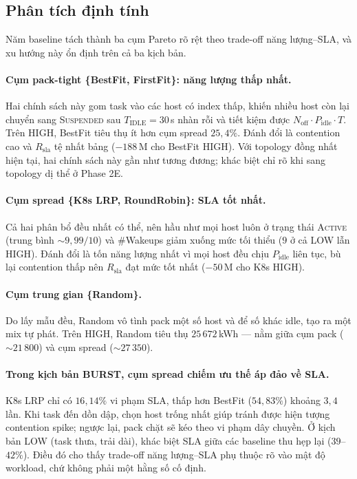 \subsection{Phân tích định tính}
\label{ssec:res-baseline-analysis}

Năm baseline tách thành ba cụm Pareto rõ rệt theo trade-off năng
lượng--SLA, và xu hướng này ổn định trên cả ba kịch bản.

\paragraph{Cụm pack-tight \{BestFit, FirstFit\}: năng lượng thấp nhất.}
Hai chính sách này gom task vào các host có index thấp, khiến nhiều
host còn lại chuyển sang \textsc{Suspended} sau $T_{\mathrm{IDLE}} =
30$\,s nhàn rỗi và tiết kiệm được $N_{\mathrm{off}} \cdot
P_{\mathrm{idle}} \cdot T$. Trên HIGH, BestFit tiêu thụ ít hơn cụm
spread $25{,}4\%$. Đánh đổi là contention cao và $R_{\mathrm{sla}}$
tệ nhất bảng ($-188$\,M cho BestFit HIGH). Với topology đồng nhất
hiện tại, hai chính sách này gần như tương đương; khác biệt chỉ rõ
khi sang topology dị thể ở Phase 2E.

\paragraph{Cụm spread \{K8s LRP, RoundRobin\}: SLA tốt nhất.}
Cả hai phân bổ đều nhất có thể, nên hầu như mọi host luôn ở trạng
thái \textsc{Active} (trung bình $\sim 9{,}99/10$) và $\#$Wakeups
giảm xuống mức tối thiểu ($9$ ở cả LOW lẫn HIGH). Đánh đổi là tốn
năng lượng nhất vì mọi host đều chịu $P_{\mathrm{idle}}$ liên tục,
bù lại contention thấp nên $R_{\mathrm{sla}}$ đạt mức tốt nhất
($-50$\,M cho K8s HIGH).

\paragraph{Cụm trung gian \{Random\}.} Do lấy mẫu đều, Random vô tình
pack một số host và để số khác idle, tạo ra một mix tự phát. Trên
HIGH, Random tiêu thụ $25\,672$\,kWh --- nằm giữa cụm pack
($\sim 21\,800$) và cụm spread ($\sim 27\,350$).

\paragraph{Trong kịch bản BURST, cụm spread chiếm ưu thế áp đảo về SLA.}
K8s LRP chỉ có $16{,}14\%$ vi phạm SLA, thấp hơn BestFit ($54{,}83\%$)
khoảng $3{,}4$ lần. Khi task đến dồn dập, chọn host trống nhất giúp
tránh được hiện tượng contention spike; ngược lại, pack chặt sẽ kéo
theo vi phạm dây chuyền. Ở kịch bản LOW (task thưa, trải dài), khác
biệt SLA giữa các baseline thu hẹp lại ($39$--$42\%$). Điều đó cho
thấy trade-off năng lượng--SLA phụ thuộc rõ vào mật độ workload, chứ
không phải một hằng số cố định.


